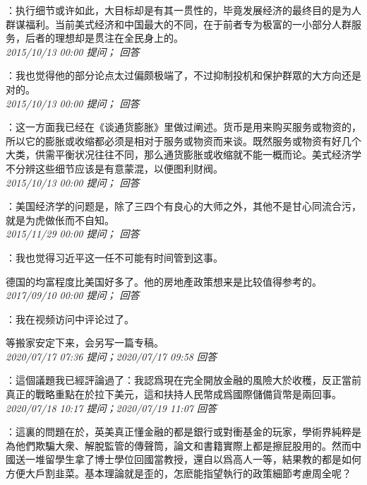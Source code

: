 \documentclass[twocolumn]{ctexart}
\begin{document}
：执行细节或许如此，大目标却是有其一贯性的，毕竟发展经济的最终目的是为人群谋福利。当前美式经济和中国最大的不同，在于前者专为极富的一小部分人群服务，后者的理想却是贯注在全​​民身上的。\\

\textit{\hfill\noindent\small 2015/10/13 00:00 提问； 回答}

：我也觉得他的部分论点太过偏颇极端了，不过抑制投机和保护群眾的大方向还是对的。\\

\textit{\hfill\noindent\small 2015/10/13 00:00 提问； 回答}

：这一方面我已经在《谈通货膨胀》里做过阐述。货币是用来购买服务或物资的，所以它的膨胀或收缩都必须是相对于服务或物资而来谈。既然服务或物资有好几个大类，供需平衡状况往往不同，那么通货膨胀或收缩就不能一概而论。美式经济学不分辨这些细节应该是有意蒙混，以便图利财阀。\\

\textit{\hfill\noindent\small 2015/10/13 00:00 提问； 回答}

：美国经济学的问题是，除了三四个有良心的大师之外，其他不是甘心同流合污，就是为虎做伥而不自知。\\

\textit{\hfill\noindent\small 2015/11/29 00:00 提问； 回答}

：我也觉得习近平这一任不可能有时间管到这事。

德国的均富程度比美国好多了。他的房地產政策想来是比较值得参考的。\\

\textit{\hfill\noindent\small 2017/09/10 00:00 提问； 回答}

：我在视频访问中评论过了。

等搬家安定下来，会另写一篇专稿。\\

\textit{\hfill\noindent\small 2020/07/17 07:36 提问；2020/07/17 09:58 回答}

：這個議題我已經評論過了：我認爲現在完全開放金融的風險大於收穫，反正當前真正的戰略重點在於拉下美元，這和扶持人民幣成爲國際儲備貨幣是兩回事。
\\

\textit{\hfill\noindent\small 2020/07/18 10:17 提问；2020/07/19 11:07 回答}

：這裏的問題在於，英美真正懂金融的都是銀行或對衝基金的玩家，學術界純粹是為他們欺騙大衆、解脫監管的傳聲筒，論文和書籍實際上都是擦屁股用的。然而中國送一堆留學生拿了博士學位回國當教授，還自以爲高人一等，結果教的都是如何方便大戶割韭菜。基本理論就是歪的，怎麽能指望執行的政策細節考慮周全呢？
\end{document}
